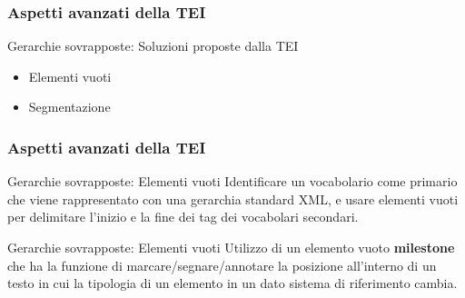     \begin{frame}
        \frametitle{Aspetti avanzati della TEI}
        \addtocounter{nframe}{1}
        

        \begin{block}{Gerarchie sovrapposte: Soluzioni proposte dalla TEI}
            \begin{itemize}
                \item Elementi vuoti
                \item Segmentazione
            \end{itemize}
        \end{block}
        
    \end{frame}


    \begin{frame}
        \frametitle{Aspetti avanzati della TEI}
        \addtocounter{nframe}{1}
        

        \begin{block}{Gerarchie sovrapposte: Elementi vuoti}
            Identificare un vocabolario come primario che viene rappresentato con una gerarchia standard XML, e usare elementi vuoti per delimitare l’inizio e la fine dei tag dei vocabolari secondari.
        \end{block}

        \begin{block}{Gerarchie sovrapposte: Elementi vuoti}
            Utilizzo di un elemento vuoto \textbf{milestone} che ha la funzione di marcare/segnare/annotare la posizione all’interno di un testo in cui la tipologia di un elemento in un dato sistema di riferimento cambia.
        \end{block}
        
    \end{frame}

